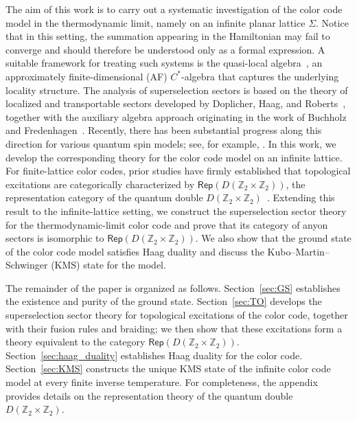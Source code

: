 \documentclass[a4paper,11pt]{article}
\newcommand{\Zbb}{\mathbb{Z}}
\theoremstyle{definition}
\theoremstyle{remark}
\theoremstyle{remark}
\newcommand\Rep {\mathsf{Rep}}
\begin{document}
The aim of this work is to carry out a systematic investigation of the color code model in the thermodynamic limit, namely on an infinite planar lattice $\Sigma$.  
Notice that in this setting, the summation appearing in the Hamiltonian may fail to converge and should therefore be understood only as a formal expression.  
A suitable framework for treating such systems is the quasi-local algebra~\cite{bratteli1987operator,bratteli1997operator}, an approximately finite-dimensional (AF) $C^*$-algebra that captures the underlying locality structure.  
The analysis of superselection sectors is based on the theory of localized and transportable sectors developed by Doplicher, Haag, and Roberts~\cite{doplicher1971local,doplicher1974local}, together with the auxiliary algebra approach originating in the work of Buchholz and Fredenhagen~\cite{Buchholz1982locality}.  
Recently, there has been substantial progress along this direction for various quantum spin models; see, for example, \cite{naaijkens2011localized,fiedler2015haag,wallick2023algebraic,bols2025classification,Cha2018infinite,bols2025sector,bols2026sectorII,bols2026anyon}.
In this work, we develop the corresponding theory for the color code model on an infinite lattice.
For finite-lattice color codes, prior studies have firmly established that topological excitations are categorically characterized by $\Rep(D(\mathbb{Z}_2 \times \mathbb{Z}_2))$, the representation category of the quantum double $D(\mathbb{Z}_2 \times \mathbb{Z}_2)$~\cite{Bombin2006colorcode,bombin2012universal,Kubica2015color,Kubica2015ColorCode,kesselring2024anyon,Kesselring2018boundaries}.  
Extending this result to the infinite-lattice setting, we construct the superselection sector theory for the thermodynamic-limit color code and prove that its category of anyon sectors is isomorphic to $\Rep(D(\mathbb{Z}_2 \times \mathbb{Z}_2))$. We also show that the ground state of the color code model satisfies Haag duality and discuss the Kubo--Martin--Schwinger (KMS) state \cite{kubo1957statistical,martin1959KMStheory,Haag1967KMS} for the model.


The remainder of the paper is organized as follows.  
Section~\ref{sec:GS} establishes the existence and purity of the ground state.  
Section~\ref{sec:TO} develops the superselection sector theory for topological excitations of the color code, together with their fusion rules and braiding; we then show that these excitations form a theory equivalent to the category $\Rep(D(\Zbb_2\times \Zbb_2))$.  
Section~\ref{sec:haag_duality} establishes Haag duality for the color code.  
Section~\ref{sec:KMS} constructs the unique KMS state of the infinite color code model at every finite inverse temperature.
For completeness, the appendix provides details on the representation theory of the quantum double $D(\Zbb_2\times \Zbb_2)$.
\end{document}
